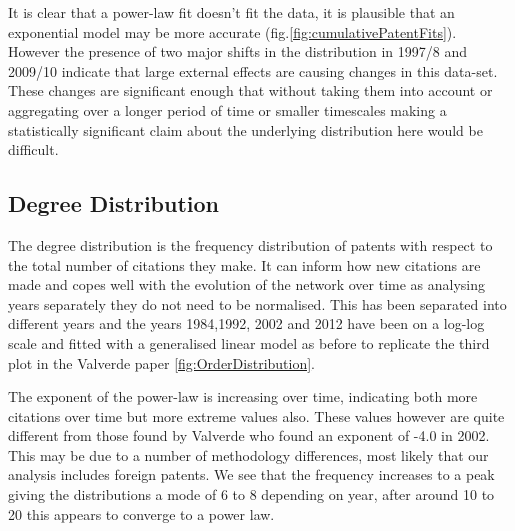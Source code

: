 It is clear that a power-law fit doesn't fit the data, it is plausible that an exponential model may be more accurate (fig.\ref{fig:cumulativePatentFits}). However the presence of two major shifts in the distribution in 1997/8 and 2009/10 indicate that large external effects are causing changes in this data-set. These changes are significant enough that without taking them into account or aggregating over a longer period of time or smaller timescales making a statistically significant claim about the underlying distribution here would be difficult.  



\subsection{Degree Distribution} \label{Degree Distribution}

The degree distribution is the frequency distribution of patents with respect to the total number of citations they make. It can inform how new citations are made and copes well with the evolution of the network over time as analysing years separately they do not need to be normalised. This has been separated into different years and the years 1984,1992, 2002 and 2012 have been on a log-log scale and fitted with a generalised linear model as before to replicate the third plot in the Valverde paper \ref{fig:OrderDistribution}. 

The exponent of the power-law is increasing over time, indicating both more citations over time but more extreme values also. These values however are quite different from those found by Valverde who found an exponent of -4.0 in 2002. This may be due to a number of methodology differences, most likely that our analysis includes foreign patents. We see that the frequency increases to a peak giving the distributions a mode of 6 to 8 depending on year, after around 10 to 20 this appears to converge to a power law.

